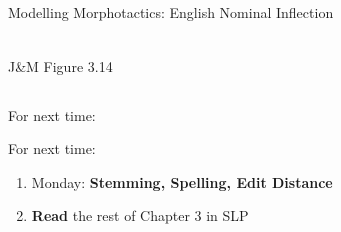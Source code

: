 \documentclass[9pt,xcolor=pdftex,dvipsnames,table]{beamer}
\begin{document}
\subsection{}
\begin{frame}{Modelling Morphotactics: English Nominal Inflection}

\begin{center}
	\\
	{\large J\&M Figure 3.14}\\
\end{center}
\end{frame}

\subsection{}
\begin{frame}{For next time:}
     \begin{block}{For next time:}
          \begin{enumerate}
          \item Monday: \textbf{Stemming, Spelling, Edit Distance}
          \item \textbf{Read} the rest of Chapter 3 in SLP
          \end{enumerate}
     \end{block}
\end{frame}
\end{document}
